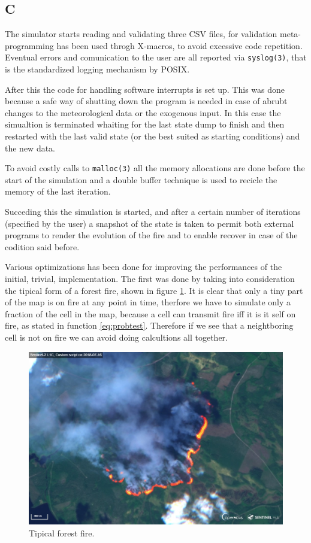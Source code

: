 \documentclass[Lau]{sapthesis} %
\begin{document}
\subsection{C}

The simulator starts reading and validating three CSV files, for validation
meta-programming has been used throgh X-macros, to avoid excessive code
repetition. Eventual errors and comunication to the user are all reported via
\texttt{syslog(3)}, that is the standardized logging mechanism by POSIX.

After this the code for handling software interrupts is set up. This was done
because a safe way of shutting down the program is needed in case of abrubt
changes to the meteorological data or the exogenous input. In this case the
simualtion is terminated whaiting for the last state dump to finish and then
restarted with the last valid state (or the best suited as starting conditions)
and the new data.

To avoid costly calls to \texttt{malloc(3)} all the memory allocations are done
before the start of the simulation and a double buffer technique is used to
recicle the memory of the last iteration.

Succeding this the simulation is started, and after a certain number of
iterations (specified by the user) a snapshot of the state is taken to permit
both external programs to render the evolution of the fire and to enable recover
in case of the codition said before.

Various optimizations has been done for improving the performances of the
initial, trivial, implementation. The first was done by taking into
consideration the tipical form of a forest fire, shown in figure \ref{fig:fire}.
It is clear that only a tiny part of the map is on fire at any point in time,
therfore we have to simulate only a fraction of the cell in the map, because a
cell can transmit fire iff it is it self on fire, as stated in function
\ref{eq:probtest}. Therefore if we see that a neightboring cell is not on fire
we can avoid doing calcultions all together.

\begin{figure}
\centering
\includegraphics[scale=0.2]{fire.jpg}
\caption{Tipical forest fire.}
\label{fig:fire}
\end{figure}
\end{document}
